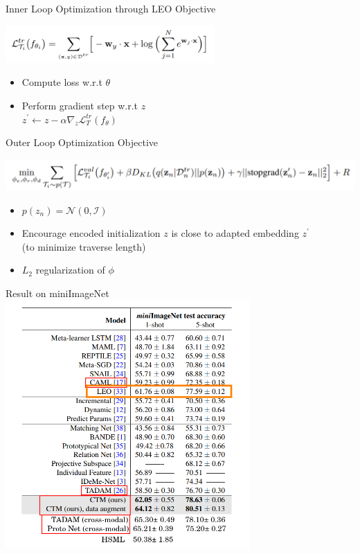 \documentclass{beamer}
\begin{document}
\begin{frame}{Inner Loop Optimization through LEO}
  Objective
  \begin{center}
  \includegraphics[width=0.6\textwidth]{fig/LEO-inner-obj.png}
  \end{center}

  \begin{itemize}
    \item Compute loss w.r.t $\theta$
    \item Perform gradient step w.r.t $z$ \\
      $z^\prime \leftarrow z - \alpha \nabla_z \mathcal{L}^{tr}_{T}(f_{\theta})$

  \end{itemize}
\end{frame}

\begin{frame}{Outer Loop Optimization}
  Objective

  \center \includegraphics[width=1.0\textwidth]{fig/LEO-outer-obj.png}
  \begin{itemize}
    \item $p(z_n) = \mathcal{N}(0,\mathcal{I})$
    \item Encourage encoded initialization $z$ is close to adapted embedding $z^\prime$ \\
      (to minimize traverse length)
    \item $L_2$ regularization of $\phi$
  \end{itemize}
\end{frame}

\begin{frame}{Result on miniImageNet}
  \center \includegraphics[width=0.7\textwidth]{fig/LEO-result.png}
\end{frame}
\end{document}
